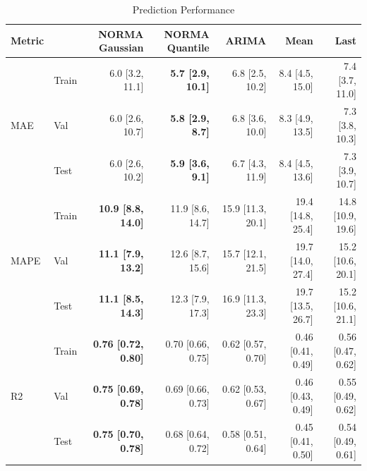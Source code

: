 \begin{table}[ht]
\centering
\footnotesize
\begin{tabular}{llrrrrr}
\toprule
Metric & & NORMA Gaussian & NORMA Quantile & ARIMA & Mean & Last \\
\midrule
\multirow{3}{*}{MAE} & Train & 6.0 [3.2, 11.1] & \textbf{5.7 [2.9, 10.1]} & 6.8 [2.5, 10.2] & 8.4 [4.5, 15.0] & 7.4 [3.7, 11.0] \\
 & Val & 6.0 [2.6, 10.7] & \textbf{5.8 [2.9, 8.7]} & 6.8 [3.6, 10.0] & 8.3 [4.9, 13.5] & 7.3 [3.8, 10.3] \\
 & Test & 6.0 [2.6, 10.2] & \textbf{5.9 [3.6, 9.1]} & 6.7 [4.3, 11.9] & 8.4 [4.5, 13.6] & 7.3 [3.9, 10.7] \\
\midrule
\multirow{3}{*}{MAPE} & Train & \textbf{10.9 [8.8, 14.0]} & 11.9 [8.6, 14.7] & 15.9 [11.3, 20.1] & 19.4 [14.8, 25.4] & 14.8 [10.9, 19.6] \\
 & Val & \textbf{11.1 [7.9, 13.2]} & 12.6 [8.7, 15.6] & 15.7 [12.1, 21.5] & 19.7 [14.0, 27.4] & 15.2 [10.6, 20.1] \\
 & Test & \textbf{11.1 [8.5, 14.3]} & 12.3 [7.9, 17.3] & 16.9 [11.3, 23.3] & 19.7 [13.5, 26.7] & 15.2 [10.6, 21.1] \\
\midrule
\multirow{3}{*}{R2} & Train & \textbf{0.76 [0.72, 0.80]} & 0.70 [0.66, 0.75] & 0.62 [0.57, 0.70] & 0.46 [0.41, 0.49] & 0.56 [0.47, 0.62] \\
 & Val & \textbf{0.75 [0.69, 0.78]} & 0.69 [0.66, 0.73] & 0.62 [0.53, 0.67] & 0.46 [0.43, 0.49] & 0.55 [0.49, 0.62] \\
 & Test & \textbf{0.75 [0.70, 0.78]} & 0.68 [0.64, 0.72] & 0.58 [0.51, 0.64] & 0.45 [0.41, 0.50] & 0.54 [0.49, 0.61] \\
\bottomrule
\end{tabular}
\caption{Prediction Performance}
\label{tab:prediction_performance}
\end{table}